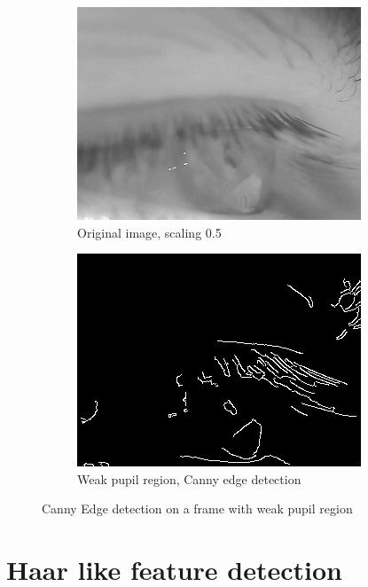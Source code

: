 \begin{figure}[ht]
    \centering
    \begin{subfigure}{.5\textwidth}
      \centering
      \includegraphics[width=.9\linewidth]{plots/orig_canny_eyelids.png}
      \caption{Original image, scaling 0.5}
      \label{fig:orig_canny_lids}
    \end{subfigure}%
    \begin{subfigure}{.5\textwidth}
      \centering
      \includegraphics[width=.9\linewidth]{plots/canny_eyelids.png}
      \caption{Weak pupil region, Canny edge detection}
      \label{fig:canny_eyelid}
    \end{subfigure}
    \caption{Canny Edge detection on a frame with weak pupil region}
    \label{fig:canny_eyelid}
\end{figure}

\section{Haar like feature detection }
\label{subsec:haar}
